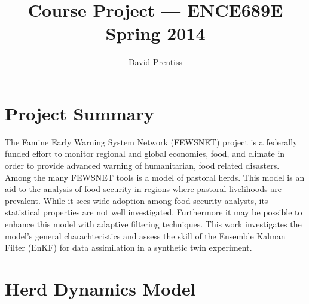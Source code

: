 \documentclass[fleqn, letterpaper]{amsart}
\title{Course Project --- ENCE689E Spring 2014}
\author{David Prentiss}
\begin{document}
\maketitle

\section{Project Summary}

The Famine Early Warning System Network (FEWSNET) project is a federally funded effort to monitor regional and global economies, food, and climate in order to provide advanced warning of humanitarian, food related disasters.
Among the many FEWSNET tools is a model of pastoral herds. This model is an aid to the analysis of food security in regions where pastoral livelihoods are prevalent. While it sees wide adoption among food security analysts, its statistical properties are not well investigated.
Furthermore it may be possible to enhance this model with adaptive filtering techniques.
This work investigates the model's general charachteristics and assess the skill of the Ensemble Kalman Filter (EnKF) for data assimilation in a synthetic twin experiment.

\section{Herd Dynamics Model}
\end{document}
